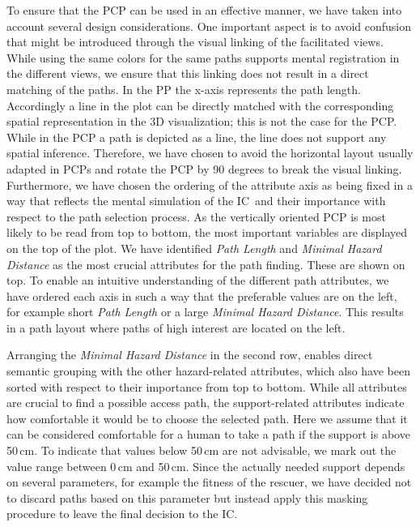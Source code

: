 \documentclass[review,journal]{vgtc}         %
\def\IC{IC}
\begin{document}
To ensure that the PCP can be used in an effective manner, we have taken into account several design considerations. One important aspect is to avoid confusion that might be introduced through the visual linking of the facilitated views. While using the same colors for the same paths supports mental registration in the different views, we ensure that this linking does not result in a direct matching of the paths. In the PP the x-axis represents the path length. Accordingly a line in the plot can be directly matched with the corresponding spatial representation in the 3D visualization; this is not the case for the PCP. While in the PCP a path is depicted as a line, the line does not support any spatial inference. Therefore, we have chosen to avoid the horizontal layout usually adapted in PCPs and rotate the PCP by 90 degrees to break the visual linking. Furthermore, we have chosen the ordering of the attribute axis as being fixed in a way that reflects the mental simulation of the \IC\ and their importance with respect to the path selection process. As the vertically oriented PCP is most likely to be read from top to bottom, the most important variables are displayed on the top of the plot. We have identified \emph{Path Length} and \emph{Minimal Hazard Distance} as the most crucial attributes for the path finding. These are shown on top. To enable an intuitive understanding of the different path attributes, we have ordered each axis in such a way that the preferable values are on the left, for example short \emph{Path Length} or a large \emph{Minimal Hazard Distance}. This results in a path layout where paths of high interest are located on the left.

Arranging the \emph{Minimal Hazard Distance} in the second row, enables direct semantic grouping with the other hazard-related attributes, which also have been sorted with respect to their importance from top to bottom. While all attributes are crucial to find a possible access path, the support-related attributes indicate how comfortable it would be to choose the selected path. Here we assume that it can be considered comfortable for a human to take a path if the support is above 50\,cm. To indicate that values below 50\,cm are not advisable, we mark out the value range between 0\,cm and 50\,cm. Since the actually needed support depends on several parameters, for example the fitness of the rescuer, we have decided not to discard paths based on this parameter but instead apply this masking procedure to leave the final decision to the \IC .
\end{document}
